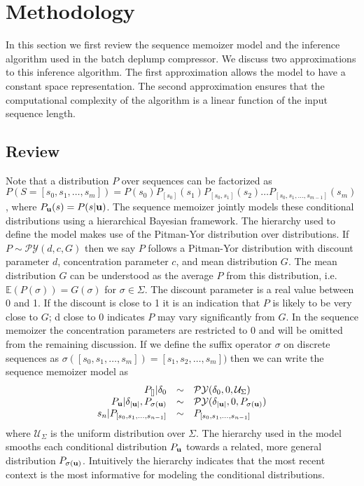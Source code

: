 \section{Methodology}
\label{section:methodology}
\newcommand{\PY}{\ensuremath{\mathcal{P}\mathcal{Y}}}

In this section we first review the sequence memoizer model and the inference algorithm used in the batch deplump compressor. We discuss two approximations to this inference algorithm.  The first approximation allows the model to have a constant space representation.  The second approximation ensures that the computational complexity of the algorithm is a linear function of the input sequence length.

\subsection{Review}

Note that a distribution $P$ over sequences can be factorized as $P(S = [s_0, s_1, \ldots, s_m]) = P(s_0)P_{[s_0]}(s_1)P_{[s_0,s_1]}(s_2) \ldots P_{[s_0,s_1,\ldots,s_{m-1}]}(s_m)$, where $P_{\bf u}(s) = P(s | {\bf u})$.  The sequence memoizer \citep{Wood2009} jointly models these conditional distributions using a hierarchical Bayesian framework.  The hierarchy used to define the model makes use of the Pitman-Yor \citep{Pitman1997} distribution over distributions. If $P \sim \PY(d,c,G)$ then we say $P$ follows a Pitman-Yor distribution with discount parameter $d$, concentration parameter $c$, and mean distribution $G$.  The mean distribution $G$ can be understood as the average $P$ from this distribution, i.e. $\mathbb{E}(P(\sigma)) = G(\sigma)$ for $\sigma \in \Sigma$.  The discount parameter is a real value between 0 and 1.  If the discount is close to 1 it is an indication that $P$ is likely to be very close to $G$; d close to 0 indicates $P$ may vary significantly from $G$.  In the sequence memoizer the concentration parameters are restricted to 0 and will be omitted from the remaining discussion. If we define the suffix operator $\sigma$ on discrete sequences as $\sigma([s_0, s_1, \ldots, s_m]) = [s_1,s_2, \ldots, s_m])$ then we can write the sequence memoizer model as 
%
\[
\begin{array}{rcl}
	P_{[ ]} 	|	\delta_0 					& \sim & \PY(\delta_0,0,\mathcal{U}_{\Sigma})\\
	P_{\bf u} 	| 	\delta_{|{\bf u}|}, P_{\sigma({\bf u})} 	& \sim & \PY(\delta_{|{\bf u}|}, 0, P_{\sigma({\bf u})}) \\
	s_n 		|  	P_{[s_0, s_1, \ldots, s_{n-1}] }	& \sim & P_{[s_0, s_1, \ldots, s_{n-1}] }
\end{array}
\]
%
\noindent where $\mathcal{U}_{\Sigma}$ is the uniform distribution over $\Sigma$.  The hierarchy used in the model smooths each conditional distribution $P_{\bf u}$ towards a related, more general distribution $P_{\sigma({\bf u})}$.  Intuitively the hierarchy indicates that the most recent context is the most informative for modeling the conditional distributions.

